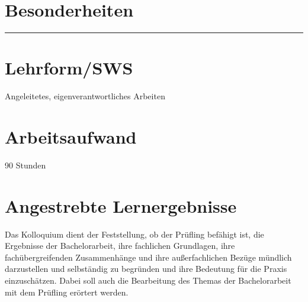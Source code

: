 \hypertarget{besonderheitenpathlabel....srcmodulbeschreibungen-bachelor-bpo5ba_bachelorkolloquium}{%
\section*{Besonderheiten\label{../../src/modulbeschreibungen-bachelor-bpo5/BA_Bachelorkolloquium}}\label{besonderheitenpathlabel....srcmodulbeschreibungen-bachelor-bpo5ba_bachelorkolloquium}}

\begin{center}\rule{0.5\linewidth}{0.5pt}\end{center}

\hypertarget{lehrformswspathlabel....srcmodulbeschreibungen-bachelor-bpo5ba_bachelorkolloquium}{%
\section*{Lehrform/SWS\label{../../src/modulbeschreibungen-bachelor-bpo5/BA_Bachelorkolloquium}}\label{lehrformswspathlabel....srcmodulbeschreibungen-bachelor-bpo5ba_bachelorkolloquium}}

Angeleitetes, eigenverantwortliches Arbeiten

\hypertarget{arbeitsaufwandpathlabel....srcmodulbeschreibungen-bachelor-bpo5ba_bachelorkolloquium}{%
\section*{Arbeitsaufwand\label{../../src/modulbeschreibungen-bachelor-bpo5/BA_Bachelorkolloquium}}\label{arbeitsaufwandpathlabel....srcmodulbeschreibungen-bachelor-bpo5ba_bachelorkolloquium}}

90 Stunden

\hypertarget{angestrebte-lernergebnissepathlabel....srcmodulbeschreibungen-bachelor-bpo5ba_bachelorkolloquium}{%
\section*{Angestrebte
Lernergebnisse\label{../../src/modulbeschreibungen-bachelor-bpo5/BA_Bachelorkolloquium}}\label{angestrebte-lernergebnissepathlabel....srcmodulbeschreibungen-bachelor-bpo5ba_bachelorkolloquium}}

Das Kolloquium dient der Feststellung, ob der Prüfling befähigt ist, die
Ergebnisse der Bachelorarbeit, ihre fachlichen Grundlagen, ihre
fachübergreifenden Zusammenhänge und ihre außerfachlichen Bezüge
mündlich darzustellen und selbständig zu begründen und ihre Bedeutung
für die Praxis einzuschätzen. Dabei soll auch die Bearbeitung des Themas
der Bachelorarbeit mit dem Prüfling erörtert werden.

